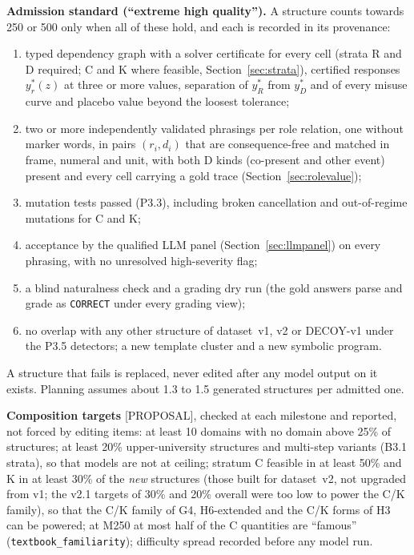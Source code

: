 \documentclass[10pt,a4paper]{article}
\newcommand{\tg}[1]{\textsc{[#1]}}
\begin{document}
\textbf{Admission standard (``extreme high quality'').} A structure counts towards 250 or 500 only when all of
these hold, and each is recorded in its provenance:
\begin{enumerate}
\item typed dependency graph with a solver certificate for every cell (strata R and D required; C and K where
feasible, Section~\ref{sec:strata}), certified responses $y^*_r(z)$ at three or more values, separation of
$y^*_R$ from $y^*_D$ and of every misuse curve and placebo value beyond the loosest tolerance;
\item two or more independently validated phrasings per role relation, one without marker words, in pairs $(r_i,d_i)$ that
are consequence-free and matched in frame, numeral and unit, with both D kinds (co-present and other event) present and every
cell carrying a gold trace (Section~\ref{sec:rolevalue});
\item mutation tests passed (P3.3), including broken cancellation and out-of-regime mutations for C and K;
\item acceptance by the qualified LLM panel (Section~\ref{sec:llmpanel}) on every phrasing, with no unresolved
high-severity flag;
\item a blind naturalness check and a grading dry run (the gold answers parse and grade as \texttt{CORRECT} under
every grading view);
\item no overlap with any other structure of dataset~v1, v2 or DECOY-v1 under the P3.5 detectors; a new template
cluster and a new symbolic program.
\end{enumerate}
A structure that fails is replaced, never edited after any model output on it exists. Planning assumes about 1.3 to
1.5 generated structures per admitted one.

\textbf{Composition targets} \tg{PROPOSAL}, checked at each milestone and reported, not forced by editing items:
at least 10 domains with no domain above 25\% of structures; at least 20\% upper-university structures and
multi-step variants (B3.1 strata), so that models are not at ceiling; stratum C feasible in at least 50\% and K in
at least 30\% of the \emph{new} structures (those built for dataset~v2, not upgraded from v1; the v2.1 targets of 30\% and 20\%
overall were too low to power the C/K family), so that the C/K family of G4, H6-extended and the C/K forms of H3 can be powered;
at M250 at most half of the C quantities are ``famous'' (\texttt{textbook\_familiarity}); difficulty spread recorded
before any model run.
\end{document}
